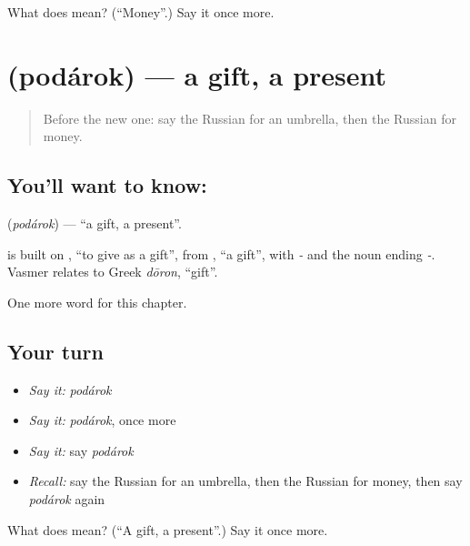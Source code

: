 \begin{tcolorbox}[breakable,colback=teal!4,colframe=teal!35!black,title={Before you move on}]
What does  mean? (\textquotedblleft{}Money\textquotedblright{}.) Say it once more.
\end{tcolorbox}
\section[\texorpdfstring{\ru{подарок} (podárok)}{подарок (podárok)}]{ (podárok) — a gift, a present}

\label{lesson:RU-C53-gift}



\begin{quote}
Before the new one: say the Russian for an umbrella, then the Russian for money.
\end{quote}

\subsection*{You'll want to know: }
\textbf{} (\emph{podárok}) — \textquotedblleft{}a gift, a present\textquotedblright{}.

\begin{cousinweb}
\textbf{} is built on \emph{}, \textquotedblleft{}to give as a gift\textquotedblright{}, from \emph{}, \textquotedblleft{}a gift\textquotedblright{}, with \emph{-} and the noun ending \emph{-}. Vasmer relates \emph{} to Greek \emph{dōron}, \textquotedblleft{}gift\textquotedblright{}.
\end{cousinweb}

\begin{grammarlens}[title={What you've built}]
One more word for this chapter.
\end{grammarlens}

\subsection*{Your turn}
\begin{itemize}
\raggedright
  \item \emph{Say it:} \emph{podárok}
  \item \emph{Say it:} \emph{podárok}, once more
  \item \emph{Say it:} say \emph{podárok}
  \item \emph{Recall:} say the Russian for an umbrella, then the Russian for money, then say \emph{podárok} again
\end{itemize}

\begin{tcolorbox}[breakable,colback=teal!4,colframe=teal!35!black,title={Before you move on}]
What does  mean? (\textquotedblleft{}A gift, a present\textquotedblright{}.) Say it once more.
\end{tcolorbox}
